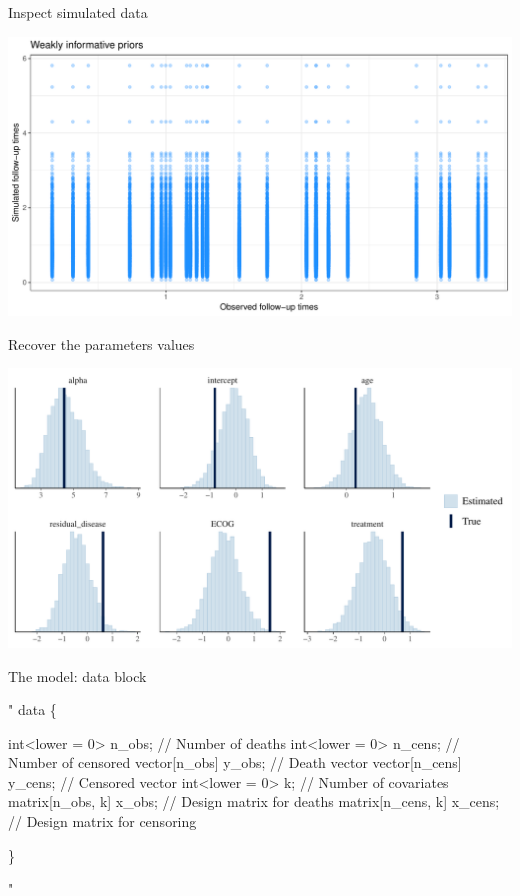 \documentclass[ignorenonframetext,a4paper]{beamer}
\newenvironment{Shaded}{\begin{snugshade}}{\end{snugshade}}
\newcommand{\StringTok}[1]{\textcolor[rgb]{0.31,0.60,0.02}{#1}}
\begin{document}
\begin{frame}{Inspect simulated data}

\includegraphics{DB_presentation_case_study_files/figure-beamer/unnamed-chunk-7-1.pdf}

\end{frame}

\begin{frame}{Recover the parameters values}

\includegraphics{DB_presentation_case_study_files/figure-beamer/unnamed-chunk-8-1.pdf}

\end{frame}

\begin{frame}[fragile]{The model: data block}

\scriptsize

\begin{Shaded}
\begin{Highlighting}[]
\StringTok{"}
\StringTok{data \{}

\StringTok{  int<lower = 0> n_obs;             // Number of deaths}
\StringTok{  int<lower = 0> n_cens;            // Number of censored}
\StringTok{  vector[n_obs] y_obs;              // Death vector}
\StringTok{  vector[n_cens] y_cens;            // Censored vector}
\StringTok{  int<lower = 0> k;                 // Number of covariates}
\StringTok{  matrix[n_obs, k] x_obs;           // Design matrix for deaths}
\StringTok{  matrix[n_cens, k] x_cens;         // Design matrix for censoring}

\StringTok{\}}

\StringTok{"}
\end{Highlighting}
\end{Shaded}

\end{frame}
\end{document}
